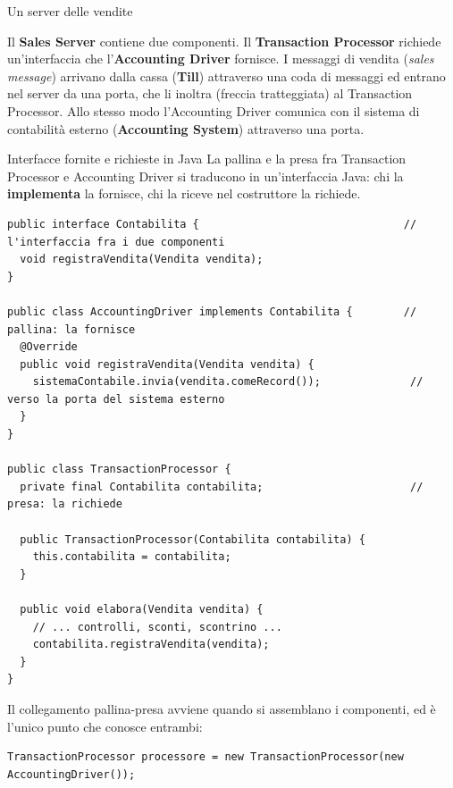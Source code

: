 \begin{esempio}{Un server delle vendite}
\begin{center}
\end{center}
Il \textbf{Sales Server} contiene due componenti. Il \textbf{Transaction Processor} richiede un'interfaccia che l'\textbf{Accounting
Driver} fornisce. I messaggi di vendita (\textit{sales message}) arrivano dalla cassa (\textbf{Till}) attraverso una coda di messaggi
ed entrano nel server da una porta, che li inoltra (freccia tratteggiata) al Transaction Processor. Allo stesso modo l'Accounting
Driver comunica con il sistema di contabilità esterno (\textbf{Accounting System}) attraverso una porta.
\end{esempio}

\begin{esempio}{Interfacce fornite e richieste in Java}
La pallina e la presa fra Transaction Processor e Accounting Driver si traducono in un'interfaccia Java: chi la
\textbf{implementa} la fornisce, chi la riceve nel costruttore la richiede.
\begin{lstlisting}[style=java, name=Contabilita.java]
public interface Contabilita {                                // l'interfaccia fra i due componenti
  void registraVendita(Vendita vendita);
}

public class AccountingDriver implements Contabilita {        // pallina: la fornisce
  @Override
  public void registraVendita(Vendita vendita) {
    sistemaContabile.invia(vendita.comeRecord());              // verso la porta del sistema esterno
  }
}

public class TransactionProcessor {
  private final Contabilita contabilita;                       // presa: la richiede

  public TransactionProcessor(Contabilita contabilita) {
    this.contabilita = contabilita;
  }

  public void elabora(Vendita vendita) {
    // ... controlli, sconti, scontrino ...
    contabilita.registraVendita(vendita);
  }
}
\end{lstlisting}
Il collegamento pallina-presa avviene quando si assemblano i componenti, ed è l'unico punto che conosce entrambi:
\begin{lstlisting}[style=java, name=SalesServer.java]
TransactionProcessor processore = new TransactionProcessor(new AccountingDriver());
\end{lstlisting}
\end{esempio}

